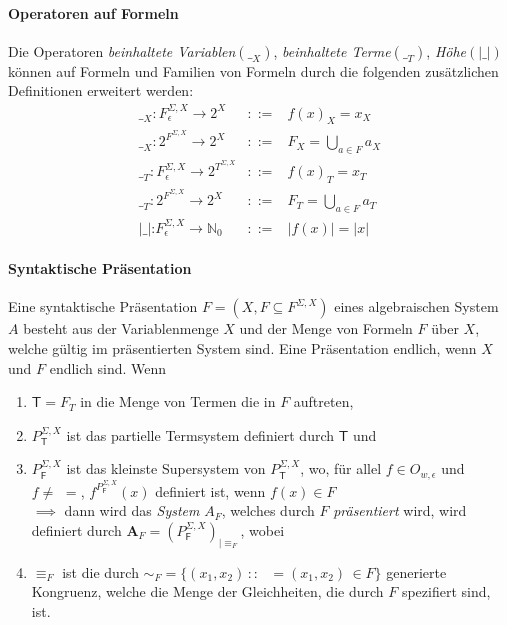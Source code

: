\paragraph{ Operatoren auf Formeln} 
Die Operatoren \emph{beinhaltete Variablen}$(\__X)$, \emph{beinhaltete Terme}$(\__T)$, \emph{Höhe}$(|\_|)$ können auf Formeln und Familien von Formeln durch die folgenden zusätzlichen Definitionen erweitert werden:
\begin{eqnarray*}
\textrm{\_}_{X}:F_{\epsilon}^{\Sigma,X}\rightarrow2^{X} & ::= & f(x)_{X}=x_{X}\\
\textrm{\_}_{X}:2^{F^{\Sigma,X}}\rightarrow2^{X} & ::= & F_{X}=\left.\bigcup\right._{a\in F}a_{X}\\
\textrm{\_}_{T}:F_{\epsilon}^{\Sigma,X}\rightarrow2^{T^{\Sigma,X}} & ::= & f(x)_{T}=x_{T}\\
\textrm{\_}_{T}:2^{F^{\Sigma,X}}\rightarrow2^{X} & ::= & F_{T}=\left.\bigcup\right._{a\in F}a_{T}\\
|\textrm{\_|:}F_{\epsilon}^{\Sigma,X}\rightarrow\mathbb{N}_{0} & ::= & |f(x)|=|x|
\end{eqnarray*}

\paragraph{ Syntaktische Präsentation}
Eine syntaktische Präsentation $F = (X, F \subseteq F^{\Sigma,X})$ eines algebraischen System $A$ besteht aus der Variablenmenge $X$ und der Menge von Formeln $F$ über $X$, welche gültig im präsentierten System sind.
Eine Präsentation endlich, wenn $X$ und $F$ endlich sind.
Wenn

\begin{enumerate}
\item $\mathsf{T}=F_{T}$ in die Menge von Termen die in $F$ auftreten,
\item $P_{\mathsf{T}}^{\Sigma,X}$ ist das partielle Termsystem definiert durch  $\mathsf{T}$ und
\item $P_{\mathsf{F}}^{\Sigma,X}$ ist das kleinste Supersystem von  $P_{\mathsf{T}}^{\Sigma,X}$, wo, für allel $f\in O_{w,\epsilon}$
und  $f\neq\,\,=$, $f^{P_{\mathsf{F}}^{\Sigma,X}}(x)$ definiert ist, wenn 
$f(x)\in F$ \\
$\implies$ dann wird das \emph{System} $A_{F}$, welches durch $F$  \emph{präsentiert} wird,
wird  definiert durch $\mathbf{A}_{F}=\left(P_{\mathsf{F}}^{\Sigma,X}\right)_{|\equiv_{F}}$, wobei
\item $\equiv_{F}$ ist die durch $\sim_{F}=\{(x_{1},x_{2})\,::\,\,\,\,=(x_{1},x_{2})\,\in F\}$ generierte Kongruenz,
welche die Menge der Gleichheiten, die durch $F$ spezifiert sind, ist.
\end{enumerate}

